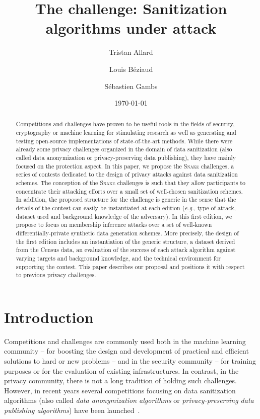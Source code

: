 \documentclass{article}
\title{The \name challenge: Sanitization algorithms under attack}
\author[1]{Tristan Allard}
\author[1,2]{Louis B\'eziaud}
\author[2]{S\'ebastien Gambs}
\affil[1]{Univ Rennes, CNRS, IRISA}
\affil[2]{Universit\'e du Qu\'eb\'ec \`a Montr\'eal}
\affil[ ]{\texttt{\{tristan.allard,louis.beziaud\}@irisa.fr, gambs.sebastien@uqam.ca}}
\affil[ ]{{\scriptsize Authors appear in alphabetical order}}
\date{\today}
\newcommand{\name}{\textsc{Snake}\xspace}
\begin{document}
\maketitle

\begin{abstract}
  Competitions and challenges have proven to be useful tools in the fields of security, cryptography or machine learning for stimulating research as well as generating and testing open-source implementations of state-of-the-art methods.
  While there were already some privacy challenges organized in the domain of data sanitization (also called data anonymization or privacy-preserving data publishing), they have mainly focused on the protection aspect.
  In this paper, we propose the \name{} challenges, a series of contests dedicated to the design of privacy attacks against data sanitization schemes.
  The conception of the \name{} challenges is such that they allow participants to concentrate their attacking efforts over a small set of well-chosen sanitization schemes.
  In addition, the proposed structure for the challenge is generic in the sense that the details of the contest can easily be instantiated at each edition (\emph{e.g.}, type of attack, dataset used and background knowledge of the adversary).
  In this first edition, we propose to focus on membership inference attacks over a set of well-known differentially-private synthetic data generation schemes.
  More precisely, the design of the first edition includes an instantiation of the generic structure, a dataset derived from the Census data, an evaluation of the success of each attack algorithm against varying targets and background knowledge, and the technical environment for supporting the contest.
  This paper describes our proposal and positions it with respect to previous privacy challenges.
\end{abstract}

\section{Introduction}

Competitions and challenges are commonly used both in the machine learning community -- for boosting the design and development of practical and efficient solutions to hard or new problems -- and in the security community -- for training purposes or for the evaluation of existing infrastructures.
In contrast, in the privacy community, there is not a long tradition of holding such challenges.
However, in recent years several competitions focusing on data sanitization algorithms (also called \emph{data anonymization algorithms} or \emph{privacy-preserving data publishing algorithms}) have been launched~\cite{boutet:hal-02512677,haspc2021,pwscup2021,ridgeway2021}.
\end{document}

